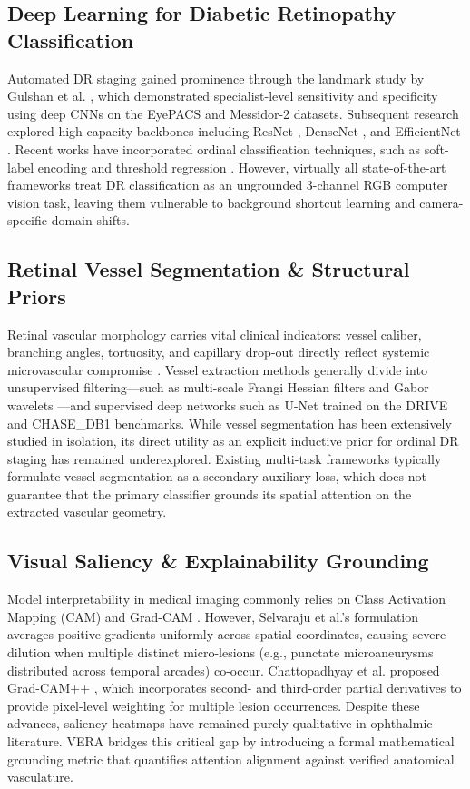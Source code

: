 \documentclass[conference]{IEEEtran}
\begin{document}
\subsection{Deep Learning for Diabetic Retinopathy Classification}
Automated DR staging gained prominence through the landmark study by Gulshan et al. \cite{gulshan2016development}, which demonstrated specialist-level sensitivity and specificity using deep CNNs on the EyePACS and Messidor-2 datasets. Subsequent research explored high-capacity backbones including ResNet \cite{he2016deep}, DenseNet \cite{huang2017densely}, and EfficientNet \cite{tan2019efficientnet}. Recent works have incorporated ordinal classification techniques, such as soft-label encoding and threshold regression \cite{gao2020diagnosis}. However, virtually all state-of-the-art frameworks treat DR classification as an ungrounded 3-channel RGB computer vision task, leaving them vulnerable to background shortcut learning and camera-specific domain shifts.

\subsection{Retinal Vessel Segmentation \& Structural Priors}
Retinal vascular morphology carries vital clinical indicators: vessel caliber, branching angles, tortuosity, and capillary drop-out directly reflect systemic microvascular compromise \cite{fraz2012blood}. Vessel extraction methods generally divide into unsupervised filtering---such as multi-scale Frangi Hessian filters \cite{frangi1998multiscale} and Gabor wavelets \cite{soares2006retinal}---and supervised deep networks such as U-Net \cite{ronneberger2015u} trained on the DRIVE and CHASE\_DB1 benchmarks. While vessel segmentation has been extensively studied in isolation, its direct utility as an explicit inductive prior for ordinal DR staging has remained underexplored. Existing multi-task frameworks typically formulate vessel segmentation as a secondary auxiliary loss, which does not guarantee that the primary classifier grounds its spatial attention on the extracted vascular geometry.

\subsection{Visual Saliency \& Explainability Grounding}
Model interpretability in medical imaging commonly relies on Class Activation Mapping (CAM) \cite{zhou2016learning} and Grad-CAM \cite{selvaraju2017grad}. However, Selvaraju et al.'s formulation averages positive gradients uniformly across spatial coordinates, causing severe dilution when multiple distinct micro-lesions (e.g., punctate microaneurysms distributed across temporal arcades) co-occur. Chattopadhyay et al. proposed Grad-CAM++ \cite{chattopadhay2018grad}, which incorporates second- and third-order partial derivatives to provide pixel-level weighting for multiple lesion occurrences. Despite these advances, saliency heatmaps have remained purely qualitative in ophthalmic literature. VERA bridges this critical gap by introducing a formal mathematical grounding metric that quantifies attention alignment against verified anatomical vasculature.
\end{document}
